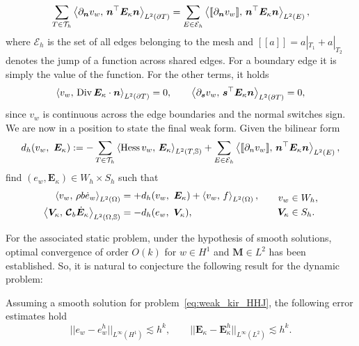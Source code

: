 \begin{equation*}
\sum_{T \in \mathcal{T}_h} \inner[L^2(\partial T)]{\partial_{\bm{n}} v_w}{\bm{n}^\top\bm{E}_\kappa \bm{n}} = \sum_{E \in \mathcal{E}_h} \inner[L^2(E)]{[\![\partial_{\bm{n}} v_w]\!]}{\bm{n}^\top\bm{E}_\kappa \bm{n}},
\end{equation*} 
where $\mathcal{E}_h$ is the set of all edges belonging to the mesh and $[\![a]\!] = a|_{T_1} + a|_{T_2}$ denotes the jump of a function across shared edges. For a boundary edge it is simply the value of the function. For the other terms, it holds 
\[
\inner[L^2(\partial T)]{v_w}{\Div \bm{E}_\kappa \cdot \bm{n}} = 0, \qquad \inner[L^2(\partial T)]{\partial_{\bm{s}} v_w}{\bm{s}^\top\bm{E}_\kappa \bm{n}} = 0,
\]
since $v_w$ is continuous across the edge boundaries and the normal switches sign. We are now in a position to state the final weak form. Given the bilinear form
\[
d_h(v_w, \ \bm{E}_{\kappa}) := - \sum_{T \in \mathcal{T}_h} \inner[L^2(T, \mathbb{S})]{\Hess v_w}{\bm{E}_\kappa} + \sum_{E \in \mathcal{E}_h} \inner[L^2(E)]{[\![\partial_n v_w]\!]}{\bm{n}^\top\bm{E}_\kappa \bm{n}}, 
\]
find $(e_w, \bm{E}_\kappa) \in W_h \times S_h$ such that
\begin{equation}
\label{eq:weak_kir_HHJ}
\begin{aligned}
\inner[L^2(\Omega)]{v_w}{\rho b \dot{e}_w} &= +d_h(v_w, \ \bm{E}_{\kappa}) + \inner[L^2(\Omega)]{v_w}{f}, \\ 
\inner[L^2(\Omega, \mathbb{S})]{\bm{V}_\kappa}{\bm{\mathcal{C}}_b \dot{\bm{E}}_\kappa} &= -d_h(e_w, \ \bm{V}_{\kappa}), \\ 
\end{aligned} \qquad
\begin{aligned}
v_w &\in W_h, \\
\bm{V}_\kappa &\in S_h. \\
\end{aligned}
\end{equation}

For the associated static problem, under the hypothesis of smooth solutions, optimal convergence of order $O(k)$ for $w \in H^1$ and $\bm{M} \in L^2$ has been established. So, it is natural to conjecture the following result for the dynamic problem:
\begin{conjecture}\label{conj:HHJestimates}
	Assuming a smooth solution for problem~\eqref{eq:weak_kir_HHJ}, the following error estimates hold
	\begin{equation}
	\label{eq:errHHJ}
	||e_w - e_w^h||_{L^{\infty} (H^1)} \lesssim h^{k}, \qquad
	||\bm{E}_\kappa - \bm{E}_\kappa^h||_{L^{\infty} (L^2)} \lesssim h^{k}.
	\end{equation}
\end{conjecture}



